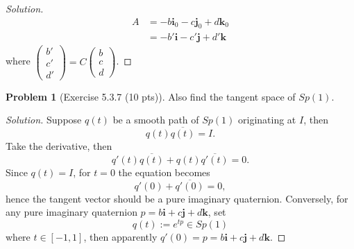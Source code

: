 \documentclass{article}
\theoremstyle{definition}
\newtheorem{problem}{Problem}
\theoremstyle{plain}
\begin{document}
\begin{adjustwidth}{0.7cm}{}
\begin{proof}[Solution]
\begin{align*}
A&=-b\bm{i}_0-c\bm{j}_0+d\bm{k}_0\\
&=-b'\bm{i}-c'\bm{j}+d'\bm{k}
\end{align*}
where $\begin{pmatrix}b'\\ c'\\ d'\end{pmatrix}=C\begin{pmatrix}b\\ c\\ d\end{pmatrix}$.
\color{black}
\end{proof}
\end{adjustwidth}

\begin{problem}[Exercise 5.3.7 (10 pts)]
Also find the tangent space of $Sp(1)$.
\end{problem}
\begin{adjustwidth}{0.7cm}{}
\color{blue}
\begin{proof}[Solution]
Suppose $q(t)$ be a smooth path of $Sp(1)$ originating at $I$, then
\begin{displaymath}
q(t)\overline{q(t)}=I.
\end{displaymath}
Take the derivative, then
\begin{displaymath}
q'(t)\overline{q(t)}+q(t)\overline{q'(t)}=0.
\end{displaymath}
Since $q(t)=I$, for $t=0$ the equation becomes
\begin{displaymath}
q'(0)+\overline{q'(0)}=0,
\end{displaymath}
hence the tangent vector should be a pure imaginary quaternion. Conversely, for any pure imaginary quaternion $p=b\bm{i}+c\bm{j}+d\bm{k}$, set
\begin{displaymath}
q(t):=e^{tp}\in Sp(1)
\end{displaymath}
where $t\in[-1,1]$, then apparently $q'(0)=p=b\bm{i}+c\bm{j}+d\bm{k}$.
\color{black}
\end{proof}
\end{adjustwidth}
\end{document}
